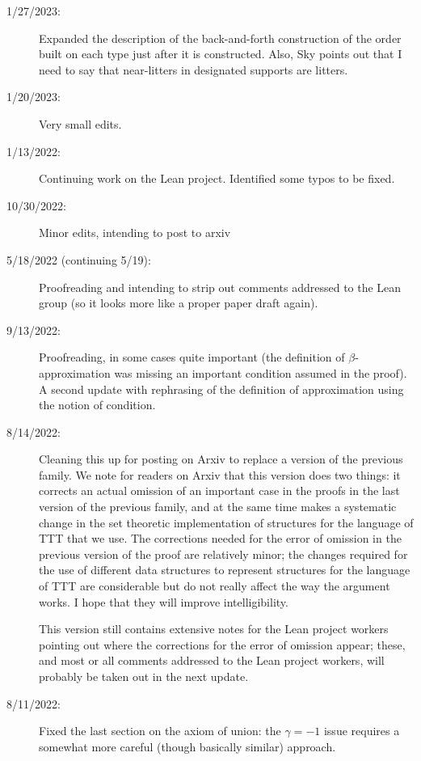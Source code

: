 \documentclass[112pt]{article}
\begin{document}
\begin{description}
\item[1/27/2023:]  Expanded the description of the back-and-forth construction of the order built on each type just after it is constructed.  Also, Sky points out that I need to say that near-litters in designated supports are litters.

\item[1/20/2023:]  Very small edits.

\item[1/13/2022:]  Continuing work on the Lean project.  Identified some typos to be fixed.

\item[10/30/2022:]  Minor edits, intending to post to arxiv

\item[5/18/2022 (continuing 5/19):]  Proofreading and intending to strip out comments addressed to the Lean group (so it looks more like a proper paper draft again).

\item[9/13/2022:]  Proofreading, in some cases quite important (the definition of $\beta$-approximation was missing an important condition assumed in the proof).   A second update with rephrasing of the definition of approximation using the notion of condition.

\item[8/14/2022:]  Cleaning this up for posting on Arxiv to replace a version of the previous family.  We note for readers on Arxiv that this version does two things:  it corrects an actual omission of an important case in the proofs in the last version of the previous family, and at the same time makes a systematic change in the set theoretic implementation
of structures for the language of TTT that we use.  The corrections needed for the error of omission in the previous version of the proof are relatively minor;  the changes required for the use of different data structures to represent structures for the language of TTT are considerable but do not really affect the way the argument works.  I hope that they will improve intelligibility.

This version still contains extensive notes for the Lean project workers pointing out where the corrections for the error of omission appear;  these, and most or all comments addressed to the Lean project workers, will probably be taken out in the next update.

\item[8/11/2022:]  Fixed the last section on the axiom of union:  the $\gamma= -1$ issue requires a somewhat more careful (though basically similar) approach.


\end{description}
\end{document}
